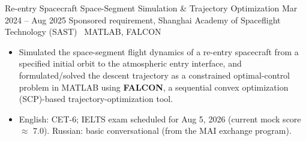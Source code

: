\documentclass{resume}
\begin{document}
\resumeentry
  {Re-entry Spacecraft Space-Segment Simulation \& Trajectory Optimization}
  {Mar 2024 -- Aug 2025}
  {Sponsored requirement, Shanghai Academy of Spaceflight Technology (SAST) \textbar\ MATLAB, FALCON}
  {}
\begin{itemize}
  \item Simulated the space-segment flight dynamics of a re-entry spacecraft from a specified initial orbit to the atmospheric entry interface, and formulated/solved the descent trajectory as a constrained optimal-control problem in MATLAB using \textbf{FALCON}, a sequential convex optimization (SCP)-based trajectory-optimization tool.
\end{itemize}




\begin{itemize}
  \item English: CET-6; IELTS exam scheduled for Aug 5, 2026 (current mock score $\approx$ 7.0). Russian: basic conversational (from the MAI exchange program).
\end{itemize}
\end{document}
